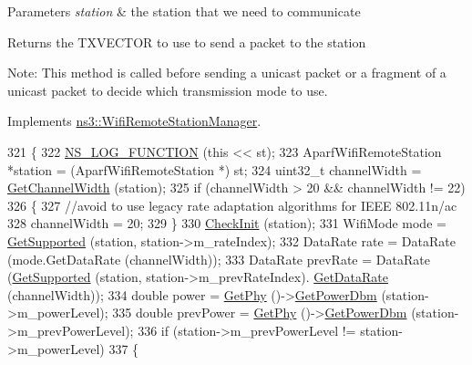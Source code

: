 \begin{DoxyParams}{Parameters}
{\em station} & the station that we need to communicate\\
\hline
\end{DoxyParams}
\begin{DoxyReturn}{Returns}
the T\+X\+V\+E\+C\+T\+OR to use to send a packet to the station
\end{DoxyReturn}
Note\+: This method is called before sending a unicast packet or a fragment of a unicast packet to decide which transmission mode to use. 

Implements \hyperlink{classns3_1_1WifiRemoteStationManager_a5a6b2bfcd4959da43c54f0072bd01202}{ns3\+::\+Wifi\+Remote\+Station\+Manager}.


\begin{DoxyCode}
321 \{
322   \hyperlink{log-macros-disabled_8h_a90b90d5bad1f39cb1b64923ea94c0761}{NS\_LOG\_FUNCTION} (\textcolor{keyword}{this} << st);
323   AparfWifiRemoteStation *station = (AparfWifiRemoteStation *) st;
324   uint32\_t channelWidth = \hyperlink{classns3_1_1WifiRemoteStationManager_a918213c5b9fa629c4986f6d90521bbd4}{GetChannelWidth} (station);
325   \textcolor{keywordflow}{if} (channelWidth > 20 && channelWidth != 22)
326     \{
327       \textcolor{comment}{//avoid to use legacy rate adaptation algorithms for IEEE 802.11n/ac}
328       channelWidth = 20;
329     \}
330   \hyperlink{classns3_1_1AparfWifiManager_a98a3fc4dfff3bcc1bc452dfed963576f}{CheckInit} (station);
331   WifiMode mode = \hyperlink{classns3_1_1WifiRemoteStationManager_a995c8bae0d84b168fd3e8bc9ecaacdd4}{GetSupported} (station, station->m\_rateIndex);
332   DataRate rate = DataRate (mode.GetDataRate (channelWidth));
333   DataRate prevRate = DataRate (\hyperlink{classns3_1_1WifiRemoteStationManager_a995c8bae0d84b168fd3e8bc9ecaacdd4}{GetSupported} (station, station->m\_prevRateIndex).
      \hyperlink{classns3_1_1WifiMode_adcfbe150f69da720db23387f733b8a52}{GetDataRate} (channelWidth));
334   \textcolor{keywordtype}{double} power = \hyperlink{classns3_1_1WifiRemoteStationManager_ab92b49cf78e0b72a51f5d13a1f15e242}{GetPhy} ()->\hyperlink{classns3_1_1WifiPhy_a91fbc9ea51bb2ac6114cad1f70e25af0}{GetPowerDbm} (station->m\_powerLevel);
335   \textcolor{keywordtype}{double} prevPower = \hyperlink{classns3_1_1WifiRemoteStationManager_ab92b49cf78e0b72a51f5d13a1f15e242}{GetPhy} ()->\hyperlink{classns3_1_1WifiPhy_a91fbc9ea51bb2ac6114cad1f70e25af0}{GetPowerDbm} (station->m\_prevPowerLevel);
336   \textcolor{keywordflow}{if} (station->m\_prevPowerLevel != station->m\_powerLevel)
337     \{

\end{DoxyCode}
